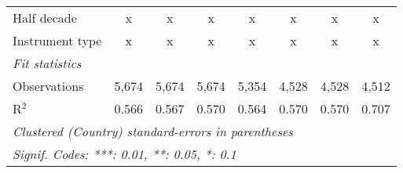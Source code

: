 \begin{tabular}{lccccccc}
   Half decade                                                                             & x            & x            & x             & x             & x             & x             & x\\  
   Instrument type                                                                         & x            & x            & x             & x             & x             & x             & x\\  
   \midrule \emph{Fit statistics}\\
   Observations                                                                            & 5,674        & 5,674        & 5,674         & 5,354         & 4,528         & 4,528         & 4,512\\  
   R$^2$                                                                                   & 0.566        & 0.567        & 0.570         & 0.564         & 0.570         & 0.570         & 0.707\\  
   \midrule
   \multicolumn{8}{l}{\emph{Clustered (Country) standard-errors in parentheses}}\\
   \multicolumn{8}{l}{\emph{Signif. Codes: ***: 0.01, **: 0.05, *: 0.1}}\\
\end{tabular}
\par\endgroup


